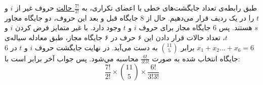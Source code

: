 \p
طبق رابطه‌ی تعداد جایگشت‌های خطی با اعضای تکراری،
به
\underline{$\frac{7!}{2!}$ حالت}  
 حروف غیر از $i$ و $t$ 
 را در یک ردیف قرار می‌دهیم. حال از 8 جایگاه قبل و بعد این حروف، دو جایگاه مجاور
  $s$ 
  هستند. پس 6 جایگاه مجاز برای حروف 
  $i$ و $t$ وجود دارد.
  با غير متمایز فرض كردن
  $i$
  و
  $t$،
 تعداد حالات قرار دادن اين ۶ حرف 
 ‌‌در ۶ جایگاه مجاز، طبق معادله سیاله‌ی
 $x_1 + x_2 \ldots + x_6 = 6$
برابر  
 \underline{$\binom{11}{5}$}
به دست می‌آید.
در نهایت جایگشت حروف 
$i$ و $t$ 
در 6 جایگاه انتخاب شده 
به صورت 
\underline{$\frac{6!}{3!3!}$}
محاسبه مي‌شود.
پس جواب آخر برابر است با:
$$\frac{7!}{2!}\times\binom{11}{5}\times\frac{6!}{3!3!}$$
